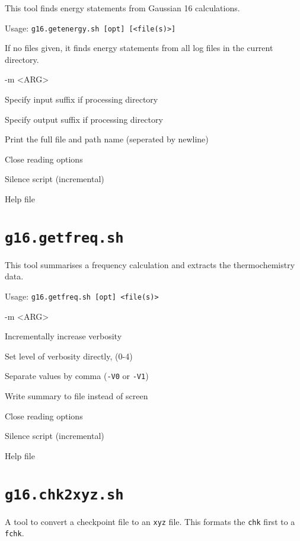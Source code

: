 \documentclass[   %
  final,          %
  a4paper,        %
  rscols=3,       %
  margin=1.0cm,   %
]{refsheet}
\begin{document}
This tool finds energy statements from Gaussian 16 calculations.

Usage: \texttt{g16.getenergy.sh [opt] [<file(s)>]}

If no files given, it finds energy statements from all log files in the current directory.

\begin{rslisttt}{-m <ARG>}
  \item[-i <ARG>] Specify input suffix if processing directory
  \item[-o <ARG>] Specify output suffix if processing directory
  \item[-L      ] Print the full file and path name (seperated by newline)
  \item[--      ] Close reading options
  \item[-s      ] Silence script (incremental)
  \item[-h      ] Help file 
\end{rslisttt}

\section{\texttt{g16.getfreq.sh}}

This tool summarises a frequency calculation and extracts the thermochemistry data.

Usage: \texttt{g16.getfreq.sh [opt] <file(s)>}

\begin{rslisttt}{-m <ARG>}
  \item[-v      ] Incrementally increase verbosity
  \item[-V <INT>] Set level of verbosity directly, (0-4)
  \item[-c      ] Separate values by comma (\texttt{-V0} or \texttt{-V1})
  \item[-f <ARG>] Write summary to file instead of screen
  \item[--      ] Close reading options
  \item[-s      ] Silence script (incremental)
  \item[-h      ] Help file 
\end{rslisttt}

\section{\texttt{g16.chk2xyz.sh}}

A tool to convert a checkpoint file to an \texttt{xyz} file. 
This formats the \texttt{chk} first to a \texttt{fchk}.
\end{document}
